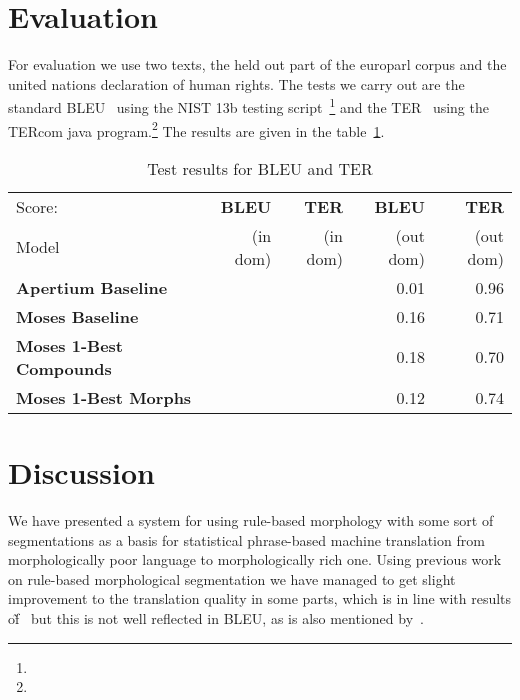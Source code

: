\documentclass[color]{pbml}
\begin{document}
\section{Evaluation}
\label{sec:evaluation}

For evaluation we use two texts, the held out part of the europarl corpus and
the united nations declaration of human rights. The tests we carry out are the
standard BLEU~\citep{} using the NIST 13b testing script~\footnote{} and the
TER~\citep{} using the TERcom java program.\footnote{} The results are given in
the table~\ref{table:results}.

\begin{table}
    \begin{center}
        \begin{tabular}{|l|r|r||r|r|}
            \hline
            Score: & \bf BLEU & \bf TER  & \bf BLEU  & \bf TER   \\
            Model  & (in dom) & (in dom) & (out dom) & (out dom) \\ 
            \hline
            \bf Apertium Baseline      &  & & 0.01 & 0.96 \\
            \hline
            \bf Moses Baseline         &  & & 0.16 & 0.71 \\
            \hline
            \bf Moses 1-Best Compounds &  & & 0.18 & 0.70 \\
            \hline
            \bf Moses 1-Best Morphs    &  & & 0.12 & 0.74 \\
            \hline
        \end{tabular}
        \caption{Test results for BLEU and TER
        \label{table:results}}
    \end{center}
\end{table}

\section{Discussion}
\label{sec:discussion}

We have presented a system for using rule-based morphology with some sort of
segmentations as a basis for statistical phrase-based machine translation from
morphologically poor language to morphologically rich one. Using previous work
on rule-based morphological segmentation we have managed to get slight
improvement to the translation quality in some parts, which is in line with
results of̃~\citet{fishel} but this is not well reflected in BLEU, as is also
mentioned by~\citet{virpioja}.
\end{document}
